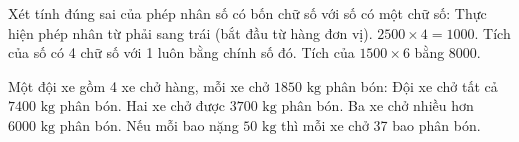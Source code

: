 \begin{ex} %
Xét tính đúng sai của phép nhân số có bốn chữ số với số có một chữ số:
\choiceTF
{\True Thực hiện phép nhân từ phải sang trái (bắt đầu từ hàng đơn vị).}
{$2500 \times 4 = 1000$.}
{\True Tích của số có 4 chữ số với 1 luôn bằng chính số đó.}
{Tích của $1500 \times 6$ bằng $8000$.}
\end{ex}

\begin{ex} %
Một đội xe gồm 4 xe chở hàng, mỗi xe chở $1850\text{ kg}$ phân bón:
\choiceTF
{\True Đội xe chở tất cả $7400\text{ kg}$ phân bón.}
{\True Hai xe chở được $3700\text{ kg}$ phân bón.}
{Ba xe chở nhiều hơn $6000\text{ kg}$ phân bón.}
{\True Nếu mỗi bao nặng $50\text{ kg}$ thì mỗi xe chở 37 bao phân bón.}
\end{ex}

